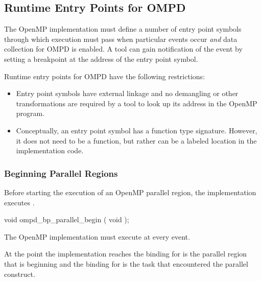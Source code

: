 \subsection{Runtime Entry Points for OMPD}
\label{subsec:runtime-entry-points-for-ompd}

The OpenMP implementation must define a number of entry point symbols
through which execution must pass when particular events occur
\emph{and} data collection for OMPD is enabled.
A tool can gain notification of the event by setting 
a breakpoint at the address of the entry point symbol.

\restrictions

Runtime entry points for OMPD have the following restrictions:
\begin{itemize}
\item Entry point symbols have external  linkage and no
demangling or other transformations are required by a tool
to look up its address in the OpenMP program.

\item Conceptually, an entry point symbol has a function type signature.
However, it does not need to be a function, but rather can be a labeled location
in the implementation code.
\end{itemize}



\subsubsection{Beginning Parallel Regions}
\label{subsubsec:ompd_bp_parallel_begin}

\summary

Before starting the execution of an OpenMP parallel region, the implementation executes
.

\format
\begin{cspecific}
\begin{ompSyntax}
void ompd_bp_parallel_begin ( void );
\end{ompSyntax}
\end{cspecific}


\descr

The OpenMP implementation must execute 
 at every  event.

At the point the implementation reaches 
the binding for  is the parallel 
region that is beginning and 
the binding for 
is the task that encountered the parallel construct.



